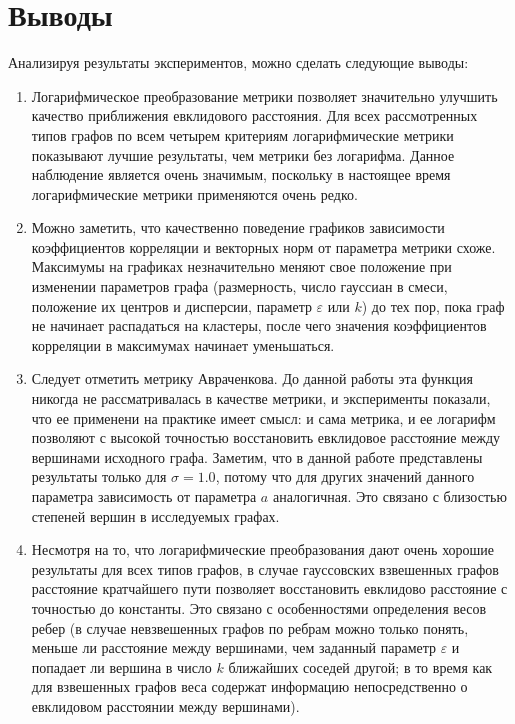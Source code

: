 \chapter*{Выводы}						%

Анализируя результаты экспериментов, можно сделать следующие выводы:
\begin{enumerate}

\item Логарифмическое преобразование метрики позволяет значительно улучшить качество приближения евклидового расстояния. Для всех рассмотренных типов графов по всем четырем критериям логарифмические метрики показывают лучшие результаты, чем метрики без логарифма. Данное наблюдение является очень значимым, поскольку в настоящее время логарифмические метрики применяются очень редко.

\item Можно заметить, что качественно поведение графиков зависимости коэффициентов корреляции и векторных норм от параметра метрики схоже. Максимумы на графиках незначительно меняют свое положение при изменении параметров графа (размерность, число гауссиан в смеси, положение их центров и дисперсии, параметр $\varepsilon$ или $k$) до тех пор, пока граф не начинает распадаться на кластеры, после чего значения коэффициентов корреляции в максимумах начинает уменьшаться.

\item Следует отметить метрику Авраченкова. До данной работы эта функция никогда не рассматривалась в качестве метрики, и эксперименты показали, что ее применени на практике имеет смысл: и сама метрика, и ее логарифм позволяют с высокой точностью восстановить евклидовое расстояние между вершинами исходного графа. Заметим, что в данной работе представлены результаты только для $\sigma=1.0$, потому что для других значений данного параметра зависимость от  параметра $a$ аналогичная. Это связано с близостью степеней вершин в исследуемых графах.

\item Несмотря на то, что логарифмические преобразования дают очень хорошие результаты для всех типов графов, в случае гауссовских взвешенных графов расстояние кратчайшего пути позволяет восстановить евклидово расстояние с точностью до константы. Это связано с особенностями определения весов ребер (в случае невзвешенных графов по ребрам можно только понять, меньше ли расстояние между вершинами, чем заданный параметр $\varepsilon$ и попадает ли вершина в число $k$ ближайших соседей другой; в то время как для взвешенных графов веса содержат информацию непосредственно о евклидовом расстоянии между вершинами).


\end{enumerate}
